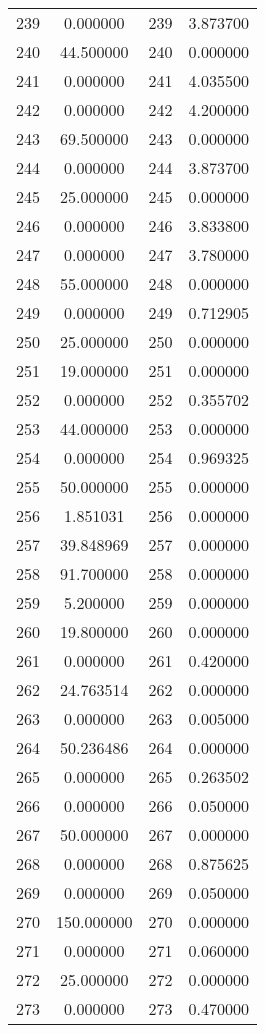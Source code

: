 \documentclass[12pt]{article}
\begin{document}
\begin{longtable}{@{}cccc@{}}
239 & 0.000000 & 239 & 3.873700 \\
240 & 44.500000 & 240 & 0.000000 \\
241 & 0.000000 & 241 & 4.035500 \\
242 & 0.000000 & 242 & 4.200000 \\
243 & 69.500000 & 243 & 0.000000 \\
244 & 0.000000 & 244 & 3.873700 \\
245 & 25.000000 & 245 & 0.000000 \\
246 & 0.000000 & 246 & 3.833800 \\
247 & 0.000000 & 247 & 3.780000 \\
248 & 55.000000 & 248 & 0.000000 \\
249 & 0.000000 & 249 & 0.712905 \\
250 & 25.000000 & 250 & 0.000000 \\
251 & 19.000000 & 251 & 0.000000 \\
252 & 0.000000 & 252 & 0.355702 \\
253 & 44.000000 & 253 & 0.000000 \\
254 & 0.000000 & 254 & 0.969325 \\
255 & 50.000000 & 255 & 0.000000 \\
256 & 1.851031 & 256 & 0.000000 \\
257 & 39.848969 & 257 & 0.000000 \\
258 & 91.700000 & 258 & 0.000000 \\
259 & 5.200000 & 259 & 0.000000 \\
260 & 19.800000 & 260 & 0.000000 \\
261 & 0.000000 & 261 & 0.420000 \\
262 & 24.763514 & 262 & 0.000000 \\
263 & 0.000000 & 263 & 0.005000 \\
264 & 50.236486 & 264 & 0.000000 \\
265 & 0.000000 & 265 & 0.263502 \\
266 & 0.000000 & 266 & 0.050000 \\
267 & 50.000000 & 267 & 0.000000 \\
268 & 0.000000 & 268 & 0.875625 \\
269 & 0.000000 & 269 & 0.050000 \\
270 & 150.000000 & 270 & 0.000000 \\
271 & 0.000000 & 271 & 0.060000 \\
272 & 25.000000 & 272 & 0.000000 \\
273 & 0.000000 & 273 & 0.470000 \\

\end{longtable}
\end{document}
